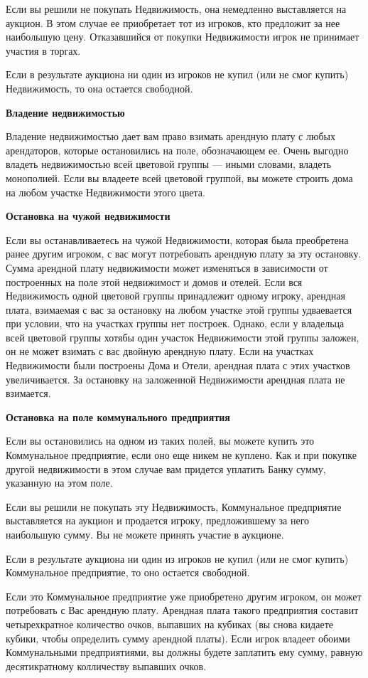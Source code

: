 Если вы решили не покупать Недвижимость, она немедленно выставляется на аукцион. В этом случае ее приобретает тот из игроков, кто предложит за нее наибольшую цену. Отказавшийся от покупки Недвижимости игрок не принимает участия в торгах.

Если в результате аукциона ни один из игроков не купил (или не смог купить) Недвижимость, то она остается свободной.

{\bf Владение недвижимостью}

Владение недвижимостью дает вам право взимать арендную плату с любых арендаторов, которые остановились на поле, обозначающем ее. Очень выгодно владеть недвижимостью всей цветовой группы — иными словами, владеть монополией. Если вы владеете всей цветовой группой, вы можете строить дома на любом участке Недвижимости этого цвета.

{\bf Остановка на чужой недвижимости}

Если вы останавливаетесь на чужой Недвижимости, которая была преобретена ранее другим игроком, с вас могут потребовать арендную плату за эту остановку. Сумма арендной плату недвижимости может изменяться в зависимости от построенных на поле этой недвижимост и домов и отелей. Если вся Недвижимость одной цветовой группы принадлежит одному игроку, арендная плата, взимаемая с вас за остановку на любом участке этой группы удваевается при условии, что на участках группы нет построек. Однако, если у владельца всей цветовой группы хотябы один участок Недвижимости этой группы заложен, он не может взимать с вас двойную арендную плату. Если на участках Недвижимости были построены Дома и Отели, арендная плата с этих участков увеличивается. За остановку на заложенной Недвижимости арендная плата не взимается.

{\bf Остановка на поле коммунального предприятия}

Если вы остановились на одном из таких полей, вы можете купить это Коммунальное предприятие, если оно еще никем не куплено. Как и при покупке другой недвижимости в этом случае вам придется уплатить Банку сумму, указанную на этом поле.

Если вы решили не покупать эту Недвижимость, Коммунальное предприятие выставляется на аукцион и продается игроку, предложившему за него наибольшую сумму. Вы не можете принять участие в аукционе.

Если в результате аукциона ни один из игроков не купил (или не смог купить) Коммунальное предприятие, то оно остается свободной.

Если это Коммунальное предприятие уже приобретено другим игроком, он может потребовать с Вас арендную плату. Арендная плата такого предприятия составит четырехкратное количество очков, выпавших на кубиках (вы снова кидаете кубики, чтобы определить сумму арендной платы). Если игрок владеет обоими Коммунальными предприятиями, вы должны будете заплатить ему сумму, равную десятикратному колличеству выпавших очков.

